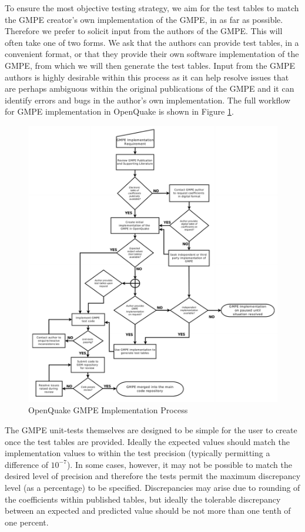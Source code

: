 To ensure the most objective testing strategy, we aim for the test tables to match the GMPE creator's own implementation of the GMPE, in as far as possible. Therefore we prefer to solicit input from the authors of the GMPE. This will often take one of two forms. We ask that the authors can provide test tables, in a convenient format, or that they provide their own software implementation of the GMPE, from which we will then generate the test tables. Input from the GMPE authors is highly desirable within this process as it can help resolve issues that are perhaps ambiguous within the original publications of the GMPE and it can identify errors and bugs in the author's own implementation. The full workflow for GMPE implementation in OpenQuake is shown in Figure \ref{fig:gmpe_flowchart}.

\begin{figure}[htbp]
  \centering
  \includegraphics[width=\textwidth]{./qareport/pictures/gmpe_implementation_flowchart.pdf}
  \caption{OpenQuake GMPE Implementation Process}
  \label{fig:gmpe_flowchart}
\end{figure}

The GMPE unit-tests themselves are designed to be simple for the user to create once the test tables are provided. Ideally the expected values should match the implementation values to within the test precision (typically permitting a difference of $10^{-7}$). In some cases, however, it may not be possible to match the desired level of precision and therefore the tests permit the maximum discrepancy level (as a percentage) to be specified. Discrepancies may arise due to rounding of the coefficients within published tables, but ideally the tolerable discrepancy between an expected and predicted value should be not more than one tenth of one percent.

